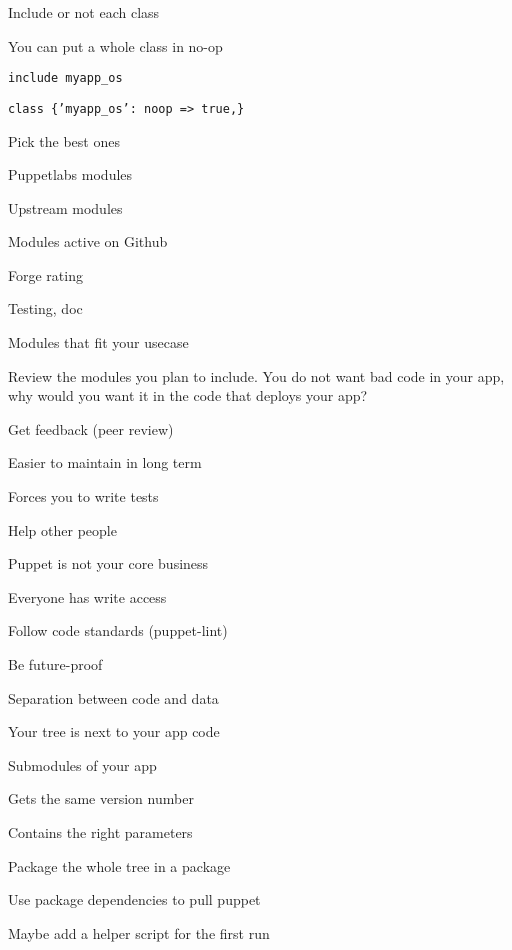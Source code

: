 \begin{iframe}
\item Include or not each class
\item You can put a whole class in no-op
\item{\texttt{include myapp\_os}}
\item{\texttt{class \{'myapp\_os': noop => true,\}}}
\end{iframe}


\begin{iframe}
\item Pick the best ones
\item Puppetlabs modules
\item Upstream modules
\item Modules active on Github
\item Forge rating
\item Testing, doc
\item Modules that fit your usecase
\end{iframe}

\begin{frame}\LARGE Review the modules you plan to include. You do not want bad code in your app, why would you want it in the code that deploys your app?\end{frame}

\begin{iframe}
\item Get feedback (peer review)
\item Easier to maintain in long term
\item Forces you to write tests
\item Help other people
\item Puppet is not your core business
\end{iframe}


\begin{iframe}
\item Everyone has write access
\item Follow code standards (puppet-lint)
\item Be future-proof
\item Separation between code and data
\end{iframe}

\begin{iframe}
\item Your tree is next to your app code
\item Submodules of your app
\item Gets the same version number
\item Contains the right parameters
\end{iframe}
\begin{iframe}
\item Package the whole tree in a package
\item Use package dependencies to pull puppet
\item Maybe add a helper script for the first run
\end{iframe}



